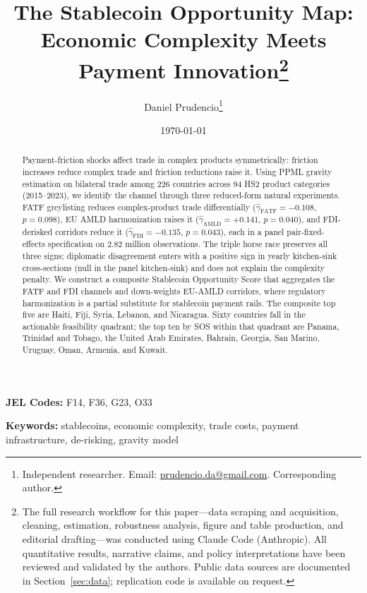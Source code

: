 \documentclass[12pt]{article}
\title{The Stablecoin Opportunity Map:\\ Economic Complexity Meets Payment Innovation\thanks{The full research workflow for this paper---data scraping and acquisition, cleaning, estimation, robustness analysis, figure and table production, and editorial drafting---was conducted using Claude Code (Anthropic). All quantitative results, narrative claims, and policy interpretations have been reviewed and validated by the authors. Public data sources are documented in Section~\ref{sec:data}; replication code is available on request.}}
\author{Daniel Prudencio\thanks{Independent researcher. Email: \href{mailto:prudencio.da@gmail.com}{prudencio.da@gmail.com}. Corresponding author.}}
\date{\today}
\begin{document}
\maketitle
\thispagestyle{empty}

\begin{abstract}
\noindent \singlespacing
Payment-friction shocks affect trade in complex products symmetrically: friction increases reduce complex trade and friction reductions raise it. Using PPML gravity estimation on bilateral trade among 226 countries across 94 HS2 product categories (2015--2023), we identify the channel through three reduced-form natural experiments. FATF greylisting reduces complex-product trade differentially ($\hat{\gamma}_{\text{FATF}} = -0.108$, $p = 0.098$), EU AMLD harmonization raises it ($\hat{\gamma}_{\text{AMLD}} = +0.141$, $p = 0.040$), and FDI-derisked corridors reduce it ($\hat{\gamma}_{\text{FDI}} = -0.135$, $p = 0.043$), each in a panel pair-fixed-effects specification on 2.82 million observations. The triple horse race preserves all three signs; diplomatic disagreement enters with a positive sign in yearly kitchen-sink cross-sections (null in the panel kitchen-sink) and does not explain the complexity penalty. We construct a composite Stablecoin Opportunity Score that aggregates the FATF and FDI channels and down-weights EU-AMLD corridors, where regulatory harmonization is a partial substitute for stablecoin payment rails. The composite top five are Haiti, Fiji, Syria, Lebanon, and Nicaragua. Sixty countries fall in the actionable feasibility quadrant; the top ten by SOS within that quadrant are Panama, Trinidad and Tobago, the United Arab Emirates, Bahrain, Georgia, San Marino, Uruguay, Oman, Armenia, and Kuwait.
\end{abstract}

\vspace{1em}
\noindent \textbf{JEL Codes:} F14, F36, G23, O33

\vspace{0.5em}
\noindent \textbf{Keywords:} stablecoins, economic complexity, trade costs, payment infrastructure, de-risking, gravity model

\newpage
\setcounter{page}{1}












\newpage
\singlespacing



\newpage
\doublespacing
\appendix

\end{document}
